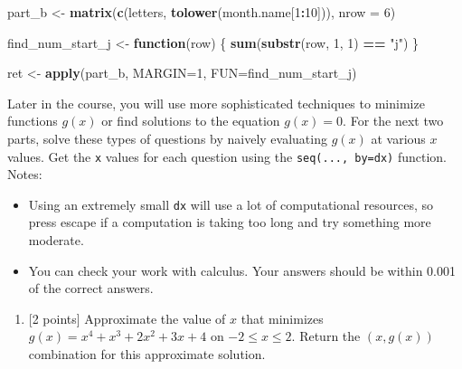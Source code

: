 \documentclass[
]{article}
\newenvironment{Shaded}{\begin{snugshade}}{\end{snugshade}}
\newcommand{\AttributeTok}[1]{\textcolor[rgb]{0.13,0.29,0.53}{#1}}
\newcommand{\ControlFlowTok}[1]{\textcolor[rgb]{0.13,0.29,0.53}{\textbf{#1}}}
\newcommand{\DecValTok}[1]{\textcolor[rgb]{0.00,0.00,0.81}{#1}}
\newcommand{\FunctionTok}[1]{\textcolor[rgb]{0.13,0.29,0.53}{\textbf{#1}}}
\newcommand{\NormalTok}[1]{#1}
\newcommand{\OtherTok}[1]{\textcolor[rgb]{0.56,0.35,0.01}{#1}}
\newcommand{\SpecialCharTok}[1]{\textcolor[rgb]{0.81,0.36,0.00}{\textbf{#1}}}
\newcommand{\StringTok}[1]{\textcolor[rgb]{0.31,0.60,0.02}{#1}}
\providecommand{\tightlist}{%
  \setlength{\itemsep}{0pt}\setlength{\parskip}{0pt}}
\begin{document}
\begin{Shaded}
\begin{Highlighting}[]
\NormalTok{part\_b }\OtherTok{\textless{}{-}} \FunctionTok{matrix}\NormalTok{(}\FunctionTok{c}\NormalTok{(letters, }\FunctionTok{tolower}\NormalTok{(month.name[}\DecValTok{1}\SpecialCharTok{:}\DecValTok{10}\NormalTok{])), }\AttributeTok{nrow =} \DecValTok{6}\NormalTok{)}

\NormalTok{find\_num\_start\_j }\OtherTok{\textless{}{-}} \ControlFlowTok{function}\NormalTok{(row) \{}
  \FunctionTok{sum}\NormalTok{(}\FunctionTok{substr}\NormalTok{(row, }\DecValTok{1}\NormalTok{, }\DecValTok{1}\NormalTok{) }\SpecialCharTok{==} \StringTok{"j"}\NormalTok{)}
\NormalTok{\}}

\NormalTok{ret }\OtherTok{\textless{}{-}} \FunctionTok{apply}\NormalTok{(part\_b, }\AttributeTok{MARGIN=}\DecValTok{1}\NormalTok{, }\AttributeTok{FUN=}\NormalTok{find\_num\_start\_j)}
\end{Highlighting}
\end{Shaded}

Later in the course, you will use more sophisticated techniques to
minimize functions \(g(x)\) or find solutions to the equation
\(g(x) = 0\). For the next two parts, solve these types of questions by
naively evaluating \(g(x)\) at various \(x\) values. Get the \texttt{x}
values for each question using the \texttt{seq(...,\ by=dx)} function.
Notes:

\begin{itemize}
\tightlist
\item
  Using an extremely small \texttt{dx} will use a lot of computational
  resources, so press escape if a computation is taking too long and try
  something more moderate.
\item
  You can check your work with calculus. Your answers should be within
  0.001 of the correct answers.
\end{itemize}

\begin{enumerate}
\def\labelenumi{(\alph{enumi})}
\setcounter{enumi}{2}
\tightlist
\item
  {[}2 points{]} Approximate the value of \(x\) that minimizes
  \(g(x) = x^4 + x^3 + 2x^2 + 3x + 4\) on \(-2 \le x \le 2\). Return the
  \((x, g(x))\) combination for this approximate solution.
\end{enumerate}
\end{document}

